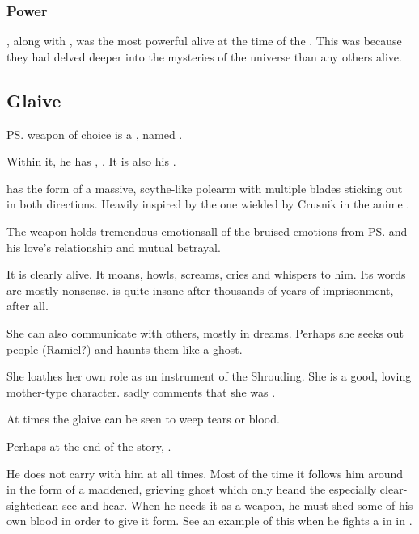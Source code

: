\subsubsection{Power}
\Iscrafel, along with \Secherdamon, was the most powerful \dragon alive at the time of the \thirdbanewar.
This was because they had delved deeper into the mysteries of the universe than any others alive. 









\subsection{Glaive} 
\ps{\Ishnaruchaefir} weapon of choice is a , named \Triestessakhin.

Within it, he has , \Triestessakhin{}. 
It is also his . 

\Triestessakhin{} has the form of a massive, scythe-like polearm with multiple blades sticking out in both directions. 
Heavily inspired by the one wielded by Crusnik in the anime \cite{Anime:TrinityBlood}.

The weapon holds tremendous emotions\dash all of the bruised emotions from \ps{\Ishnaruchaefir} and his love's relationship and mutual betrayal. 

It is clearly alive. 
It moans, howls, screams, cries and whispers to him. 
Its words are mostly nonsense. 
\Triestessakhin{} is quite insane after thousands of years of imprisonment, after all. 

She can also communicate with others, mostly in dreams. 
Perhaps she seeks out people (Ramiel?) and haunts them like a ghost. 

She loathes her own role as an instrument of the Shrouding. 
She is a good, loving mother-type character. 
\Ishnaruchaefir{} sadly comments that she was .

At times the glaive can be seen to weep tears or blood.

Perhaps at the end of the story, . 

He does not carry \Triestessakhin{} with him at all times. 
Most of the time it follows him around in the form of a maddened, grieving ghost which only he\dash and the especially clear-sighted\dash can see and hear. 
When he needs it as a weapon, he must shed some of his own blood in order to give it form. 
See an example of this {when he fights a \ghobal{} in \Malcur} in \TwilightAngelRememberEmph.

